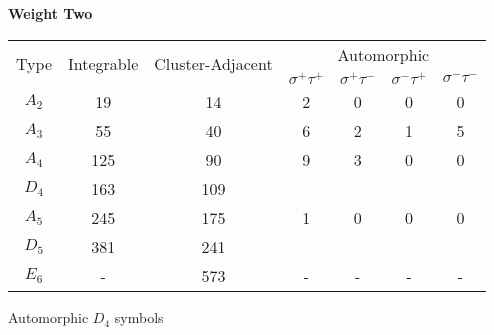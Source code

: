 \documentclass[12pt]{article}
\begin{document}
\begin{center}
{\bf Weight Two}

\begin{tabular}{ | c | c | c | c | c | c |  c |}
\multicolumn{1}{c}{\multirow{2}{*}{Type}} & \multicolumn{1}{c}{\multirow{2}{*}{Integrable}} & \multicolumn{1}{c}{\multirow{2}{*}{Cluster-Adjacent}} & \multicolumn{4}{c}{Automorphic} \\
\multicolumn{1}{c}{} & \multicolumn{1}{c}{} & \multicolumn{1}{c}{}  & \multicolumn{1}{c}{$\sigma^+ \tau^+$} & \multicolumn{1}{c}{$\sigma^+ \tau^-$} & \multicolumn{1}{c}{$\sigma^- \tau^+$} & \multicolumn{1}{c}{$\sigma^- \tau^-$} \\
\hline \(A_2\) & 19 & 14 & 2 & 0 & 0 & 0 \\ 
\hline \(A_3\) & 55 & 40 & 6 & 2 & 1 & 5 \\ 
\hline \(A_4\) & 125 & 90 & 9 & 3 & 0 & 0\\ 
\hline \(D_4\) & 163 & 109   \\ 
\hline \(A_5\) & 245 & 175 & 1 & 0 & 0 & 0 \\ 
\hline \(D_5\) & 381 & 241 \\ 
\hline \(E_6\) & - & 573 & - & - & - & -  \\ 
\hline
\end{tabular}
\vspace{.6cm}

Automorphic $D_4$ symbols


\end{center}
\end{document}

